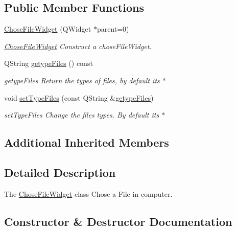 \subsection*{Public Member Functions}
\begin{DoxyCompactItemize}
\item 
\hyperlink{classGui_1_1Widgets_1_1Path_1_1ChoseFileWidget_a6d1c9a76bc56c345c6702feb9d5c668e}{Chose\+File\+Widget} (Q\+Widget $\ast$parent=0)
\begin{DoxyCompactList}\small\item\em \hyperlink{classGui_1_1Widgets_1_1Path_1_1ChoseFileWidget}{Chose\+File\+Widget} Construct a chose\+File\+Widget. \end{DoxyCompactList}\item 
Q\+String \hyperlink{classGui_1_1Widgets_1_1Path_1_1ChoseFileWidget_a69fb84fdf1c4db5c544d6cc88a7e55bf}{getype\+Files} () const 
\begin{DoxyCompactList}\small\item\em getype\+Files Return the types of files, by default it\textquotesingle{}s $\ast$ \end{DoxyCompactList}\item 
void \hyperlink{classGui_1_1Widgets_1_1Path_1_1ChoseFileWidget_a668dfb8a8197a0d82632d85010ae5748}{set\+Type\+Files} (const Q\+String \&\hyperlink{classGui_1_1Widgets_1_1Path_1_1ChoseFileWidget_a69fb84fdf1c4db5c544d6cc88a7e55bf}{getype\+Files})
\begin{DoxyCompactList}\small\item\em set\+Type\+Files Change the files types. By default it\textquotesingle{}s $\ast$ \end{DoxyCompactList}\end{DoxyCompactItemize}
\subsection*{Additional Inherited Members}


\subsection{Detailed Description}
The \hyperlink{classGui_1_1Widgets_1_1Path_1_1ChoseFileWidget}{Chose\+File\+Widget} class Chose a File in computer. 

\subsection{Constructor \& Destructor Documentation}
\hypertarget{classGui_1_1Widgets_1_1Path_1_1ChoseFileWidget_a6d1c9a76bc56c345c6702feb9d5c668e}{}
